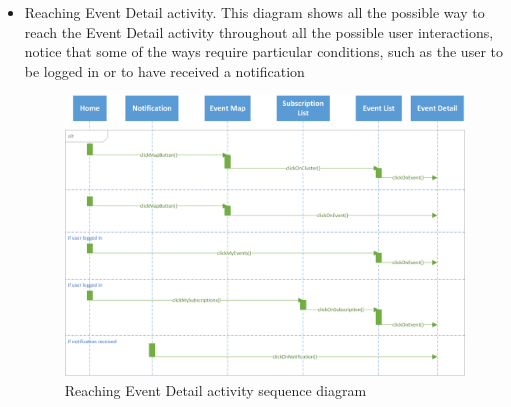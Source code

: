 \documentclass[a4paper]{scrreprt}
\begin{document}
\begin{itemize}
	\pagebreak
	\item Reaching Event Detail activity. This diagram shows all the possible way to reach the Event Detail activity throughout all the possible user interactions, notice that some of the ways require particular conditions, such as the user to be logged in or to have received a notification	
	\bigskip\begin{figure}[H]
		\centering
		\includegraphics[width=\textwidth]{diagrams/sequence/sequence_diag_eventdetail.png}
		\caption{Reaching Event Detail activity sequence diagram}
	\end{figure}

\end{itemize}
\end{document}
